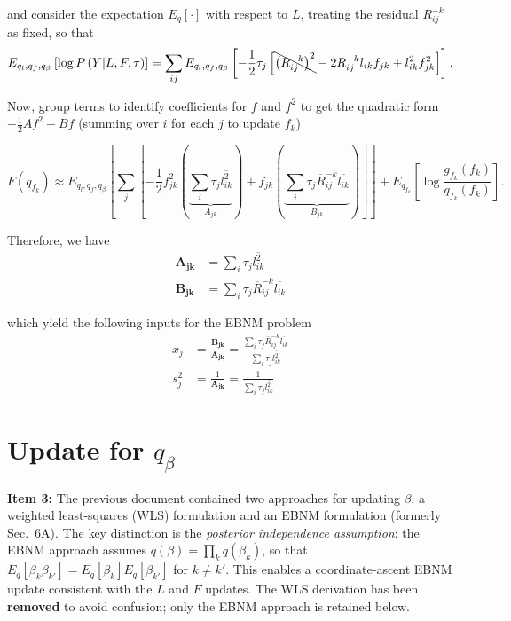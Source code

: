 \documentclass{article}[12pt]
\begin{document}
and consider the expectation $E_{q}\left[\cdot\right]$ with respect to $L$, treating the residual $R^{-k}_{ij}$ as fixed, so that
\begin{equation}
    E_{q_l, q_f, q_{\beta}}\left[\log P\left(Y \vert L, F, \tau\right)\right] = \sum_{ij}E_{q_l, q_f, q_{\beta}}\left[-\frac{1}{2}\tau_{j}\left[\bcancel{\left(R^{-k}_{ij}\right)^2}-2R^{-k}_{ij}l_{ik}f_{jk}+l^{2}_{ik}f^{2}_{jk}\right]\right].
\end{equation}

Now, group terms to identify coefficients for $f$ and $f^2$ to get the quadratic form $-\frac{1}{2}Af^2+Bf$ (summing over $i$ for each $j$ to update $f_k$)

\begin{equation}
    F\left(q_{f_k}\right) \approx E_{q_l, q_f, q_{\beta}}\left[\sum_{j}\left[-\frac{1}{2}f^{2}_{jk}\left(\underbrace{\sum_{i}\tau_{j}\overline{l^{2}_{ik}}}_{A_{jk}}\right)+f_{jk}\left(\underbrace{\sum_{i}\tau_{j}\overline{R}^{-k}_{ij}\overline{l_{ik}}}_{B_{jk}}\right)\right]\right]+E_{q_{f_k}}\left[\log \frac{g_{f_k}(f_k)}{q_{f_k}(f_k)}\right].
\end{equation}

Therefore, we have
\begin{align}
    \mathbf{A_{jk}} &= \sum_{i}\tau_{j}\overline{l^{2}_{ik}}\label{eq:A-F}\\
    \mathbf{B_{jk}} &= \sum_{i} \tau_{j}\overline{R}^{-k}_{ij}\overline{l_{ik}}\label{eq:B-F}
\end{align}

which yield the following inputs for the EBNM problem
\begin{align}
    x_j &= \frac{\mathbf{B_{jk}}}{\mathbf{A_{jk}}} = \frac{\sum_{i} \tau_{j}\overline{R}^{-k}_{ij}\overline{l_{ik}}}{\sum_{i}\tau_{j}\overline{l^{2}_{ik}}}\label{eq:xj-F}\\
    s^{2}_{j} &= \frac{1}{\mathbf{A_{jk}}} = \frac{1}{\sum_{i}\tau_{j}\overline{l^{2}_{ik}}}\label{eq:sj-F}
\end{align}
\section{Update for $q_{\beta}$}

\begin{corrbox}
\textbf{Item 3:} The previous document contained two approaches for updating $\beta$:
a weighted least-squares (WLS) formulation and an EBNM formulation (formerly
Sec.~6A). The key distinction is the \emph{posterior independence assumption}:
the EBNM approach assumes $q(\beta) = \prod_k q(\beta_k)$, so that
$E_q[\beta_k\beta_{k'}] = E_q[\beta_k]E_q[\beta_{k'}]$ for $k\neq k'$.
This enables a coordinate-ascent EBNM update consistent with the $L$ and $F$
updates. The WLS derivation has been \textbf{removed} to avoid confusion;
only the EBNM approach is retained below.
\end{corrbox}
\end{document}
